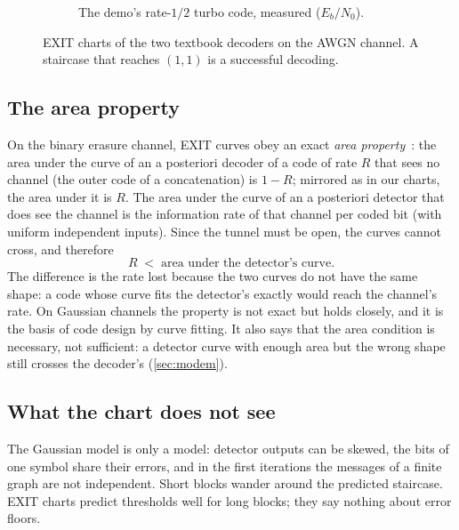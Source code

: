 \documentclass[11pt,a4paper]{article}
\newcommand{\dB}{\,\mathrm{dB}}
\newcommand{\IA}{I_{\mathrm{A}}}
\newcommand{\IE}{I_{\mathrm{E}}}
\theoremstyle{definition}
\theoremstyle{remark}
\begin{document}
\begin{figure}[htb]
\begin{subfigure}[t]{0.49\textwidth}
\caption{The demo's rate-$1/2$ turbo code, measured ($E_b/N_0$).}
\end{subfigure}
\caption{EXIT charts of the two textbook decoders on the AWGN channel. A staircase that reaches $(1,1)$ is a successful decoding.}
\label{fig:exit-textbook}
\end{figure}

\subsection{The area property}

On the binary erasure channel, EXIT curves obey an exact \emph{area property}~\cite{ashikhmin}: the area under the curve of an a posteriori decoder of a code of rate $R$ that sees no channel (the outer code of a concatenation) is $1-R$; mirrored as in our charts, the area under it is $R$. The area under the curve of an a posteriori detector that does see the channel is the information rate of that channel per coded bit (with uniform independent inputs). Since the tunnel must be open, the curves cannot cross, and therefore
\begin{equation}
  R \;<\; \text{area under the detector's curve}.
  \label{eq:area}
\end{equation}
The difference is the rate lost because the two curves do not have the same shape: a code whose curve fits the detector's exactly would reach the channel's rate. On Gaussian channels the property is not exact but holds closely, and it is the basis of code design by curve fitting. It also says that the area condition is necessary, not sufficient: a detector curve with enough area but the wrong shape still crosses the decoder's (\cref{sec:modem}).

\subsection{What the chart does not see}

The Gaussian model is only a model: detector outputs can be skewed, the bits of one symbol share their errors, and in the first iterations the messages of a finite graph are not independent. Short blocks wander around the predicted staircase. EXIT charts predict thresholds well for long blocks; they say nothing about error floors.
\end{document}
